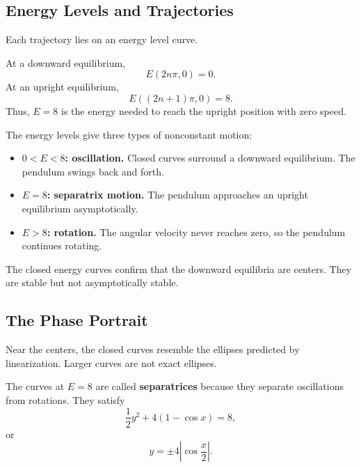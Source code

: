 \documentclass[11pt,letterpaper]{article}
\begin{document}
\subsection{Energy Levels and Trajectories}

Each trajectory lies on an energy level curve.

At a downward equilibrium,
\[
E(2n\pi,0)=0.
\]
At an upright equilibrium,
\[
E((2n+1)\pi,0)=8.
\]
Thus, $E=8$ is the energy needed to reach the
upright position with zero speed.

The energy levels give three types of nonconstant motion:
\begin{itemize}
    \item \textbf{$0<E<8$: oscillation.}
    Closed curves surround a downward equilibrium.
    The pendulum swings back and forth.

    \item \textbf{$E=8$: separatrix motion.}
    The pendulum approaches an upright equilibrium
    asymptotically.

    \item \textbf{$E>8$: rotation.}
    The angular velocity never reaches zero,
    so the pendulum continues rotating.
\end{itemize}

The closed energy curves confirm that the downward
equilibria are centers. They are stable but not
asymptotically stable.

\subsection{The Phase Portrait}

Near the centers, the closed curves resemble the
ellipses predicted by linearization. Larger curves
are not exact ellipses.

The curves at $E=8$ are called \textbf{separatrices}
because they separate oscillations from rotations.
They satisfy
\[
\frac12y^2+4(1-\cos x)=8,
\]
or
\[
y=\pm4\left|\cos\frac{x}{2}\right|.
\]
\end{document}
